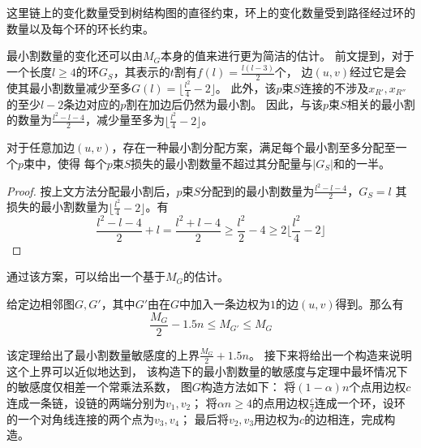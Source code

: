 这里链上的变化数量受到树结构图的直径约束，环上的变化数量受到路径经过环的数量以及每个环的环长约束。

最小割数量的变化还可以由$M_G$本身的值来进行更为简洁的估计。
前文提到，对于一个长度$l\geq 4$的环$G_S$，其表示的$t$割有$f(l)=\frac{l(l-3)}2$个，
边$(u,v)$经过它是会使其最小割数量减少至多$G(l)= \lfloor\frac{l^2}4-2\rfloor$。
此外，该$p$束$S$连接的不涉及$x_{R'},x_{R''}$的至少$l-2$条边对应的$p$割在加边后仍然为最小割。
因此，与该$p$束$S$相关的最小割的数量为$\frac{l^2-l-4}2$，减少量至多为$\lfloor\frac{l^2}4-2\rfloor$。
\begin{theorem}
  对于任意加边$(u,v)$，存在一种最小割分配方案，满足每个最小割至多分配至一个$p$束中，使得
  每个$p$束$S$损失的最小割数量不超过其分配量与$|G_S|$和的一半。
\end{theorem}

\begin{proof}
  按上文方法分配最小割后，$p$束$S$分配到的最小割数量为$\frac{l^2-l-4}2$，$G_S=l$
  其损失的最小割数量为$\lfloor\frac{l^2}4-2\rfloor$。有
  \begin{equation}
    \frac{l^2-l-4}2+l=\frac{l^2+l-4}2\geq \frac{l^2}2-4\geq 2\lfloor\frac{l^2}4-2\rfloor
  \end{equation}
\end{proof}
通过该方案，可以给出一个基于$M_G$的估计。


\begin{theorem}
  \label{sen}
  给定边相邻图$G,G'$，其中$G'$由在$G$中加入一条边权为$1$的边$(u,v)$得到。那么有
  \begin{equation}
    \frac{M_G}2-1.5n \leq M_{G'}\leq M_G
  \end{equation}

\end{theorem}
该定理给出了最小割数量敏感度的上界$\frac{M_G}2+1.5n$。
接下来将给出一个构造来说明这个上界可以近似地达到，
该构造下的最小割数量的敏感度与定理中最坏情况下的敏感度仅相差一个常乘法系数，
图$G$构造方法如下：
将$(1-\alpha) n$个点用边权$c$连成一条链，设链的两端分别为$v_1,v_2$；
将$\alpha n\geq 4$的点用边权$\frac c2$连成一个环，设环的一个对角线连接的两个点为$v_3,v_4$；
最后将$v_2,v_3$用边权为$c$的边相连，完成构造。


